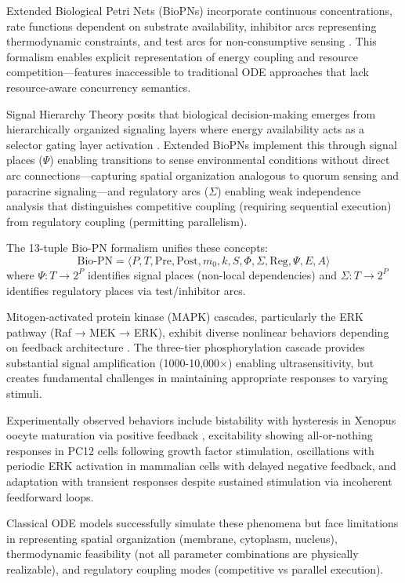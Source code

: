 \documentclass[twocolumn,11pt]{article}
\begin{document}
Extended Biological Petri Nets (BioPNs) incorporate continuous concentrations, rate functions dependent on substrate availability, inhibitor arcs representing thermodynamic constraints, and test arcs for non-consumptive sensing \citep{simao2025unified}. This formalism enables explicit representation of energy coupling and resource competition—features inaccessible to traditional ODE approaches that lack resource-aware concurrency semantics.

Signal Hierarchy Theory posits that biological decision-making emerges from hierarchically organized signaling layers where energy availability acts as a selector gating layer activation \citep{simao2025weak, eugenio2025}. Extended BioPNs implement this through signal places ($\Psi$) enabling transitions to sense environmental conditions without direct arc connections—capturing spatial organization analogous to quorum sensing and paracrine signaling—and regulatory arcs ($\Sigma$) enabling weak independence analysis that distinguishes competitive coupling (requiring sequential execution) from regulatory coupling (permitting parallelism).

The 13-tuple Bio-PN formalism unifies these concepts:
\begin{equation}
\text{Bio-PN} = \langle P, T, \text{Pre}, \text{Post}, m_0, k, S, \Phi, \Sigma, \text{Reg}, \Psi, E, A \rangle
\end{equation}
where $\Psi: T \to 2^P$ identifies signal places (non-local dependencies) and $\Sigma: T \to 2^P$ identifies regulatory places via test/inhibitor arcs.

Mitogen-activated protein kinase (MAPK) cascades, particularly the ERK pathway (Raf → MEK → ERK), exhibit diverse nonlinear behaviors depending on feedback architecture \citep{kholodenko2000, ferrell1996}. The three-tier phosphorylation cascade provides substantial signal amplification (1000-10,000×) enabling ultrasensitivity, but creates fundamental challenges in maintaining appropriate responses to varying stimuli.

Experimentally observed behaviors include bistability with hysteresis in Xenopus oocyte maturation via positive feedback \citep{ferrell2009}, excitability showing all-or-nothing responses in PC12 cells following growth factor stimulation, oscillations with periodic ERK activation in mammalian cells with delayed negative feedback, and adaptation with transient responses despite sustained stimulation via incoherent feedforward loops.


Classical ODE models successfully simulate these phenomena but face limitations in representing spatial organization (membrane, cytoplasm, nucleus), thermodynamic feasibility (not all parameter combinations are physically realizable), and regulatory coupling modes (competitive vs parallel execution).
\end{document}
